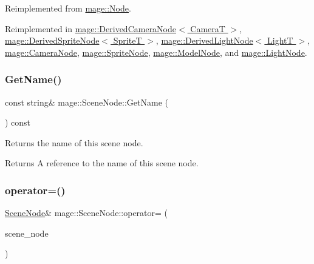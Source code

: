 Reimplemented from \hyperlink{classmage_1_1_node_a71a4763bfd4cba5653488b490e61dc8f}{mage\+::\+Node}.



Reimplemented in \hyperlink{classmage_1_1_derived_camera_node_aa965751029ebd6b41d3805b499a8304e}{mage\+::\+Derived\+Camera\+Node$<$ Camera\+T $>$}, \hyperlink{classmage_1_1_derived_sprite_node_ae1aa2b80d4ff8688635df017826c11a5}{mage\+::\+Derived\+Sprite\+Node$<$ Sprite\+T $>$}, \hyperlink{classmage_1_1_derived_light_node_acf8858989780bf45a45c55a7c5564314}{mage\+::\+Derived\+Light\+Node$<$ Light\+T $>$}, \hyperlink{classmage_1_1_camera_node_a002d3a2b41cda270a26ca5d8f3a17f55}{mage\+::\+Camera\+Node}, \hyperlink{classmage_1_1_sprite_node_a83a2a865b38670d64491a1066895e218}{mage\+::\+Sprite\+Node}, \hyperlink{classmage_1_1_model_node_a34146201083015276b38240af307417f}{mage\+::\+Model\+Node}, and \hyperlink{classmage_1_1_light_node_aea97601d0a4b8073a1c655ca334af242}{mage\+::\+Light\+Node}.

\hypertarget{classmage_1_1_scene_node_ab4d72e26370747c06ccb1461f3080b31}{}\label{classmage_1_1_scene_node_ab4d72e26370747c06ccb1461f3080b31} 
\subsubsection{\texorpdfstring{Get\+Name()}{GetName()}}
{\footnotesize\ttfamily const string\& mage\+::\+Scene\+Node\+::\+Get\+Name (\begin{DoxyParamCaption}{ }\end{DoxyParamCaption}) const\hspace{0.3cm}{\ttfamily [noexcept]}}

Returns the name of this scene node.

\begin{DoxyReturn}{Returns}
A reference to the name of this scene node. 
\end{DoxyReturn}
\hypertarget{classmage_1_1_scene_node_af4298cbc808139f9da43055afdfe8f7e}{}\label{classmage_1_1_scene_node_af4298cbc808139f9da43055afdfe8f7e} 
\subsubsection{\texorpdfstring{operator=()}{operator=()}\hspace{0.1cm}{\footnotesize\ttfamily [1/2]}}
{\footnotesize\ttfamily \hyperlink{classmage_1_1_scene_node}{Scene\+Node}\& mage\+::\+Scene\+Node\+::operator= (\begin{DoxyParamCaption}\item[{const \hyperlink{classmage_1_1_scene_node}{Scene\+Node} \&}]{scene\+\_\+node }\end{DoxyParamCaption})\hspace{0.3cm}{\ttfamily [delete]}}

